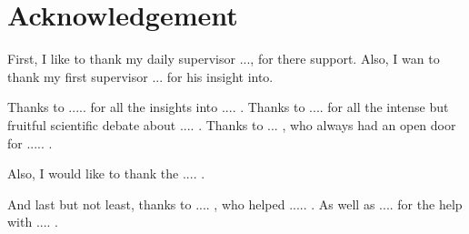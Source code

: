 \section*{Acknowledgement} %

First, I like to thank my daily supervisor ..., for there support. Also, I wan to thank my first supervisor ... for his insight into.

\noindent
Thanks to ..... for all the insights into .... . Thanks to .... for all the intense but fruitful scientific debate about .... . Thanks to ... , who always had an open door for ..... . 

\noindent
Also, I would like to thank the .... .

\noindent
And last but not least, thanks to .... , who helped ..... . As well as .... for the help with .... . 